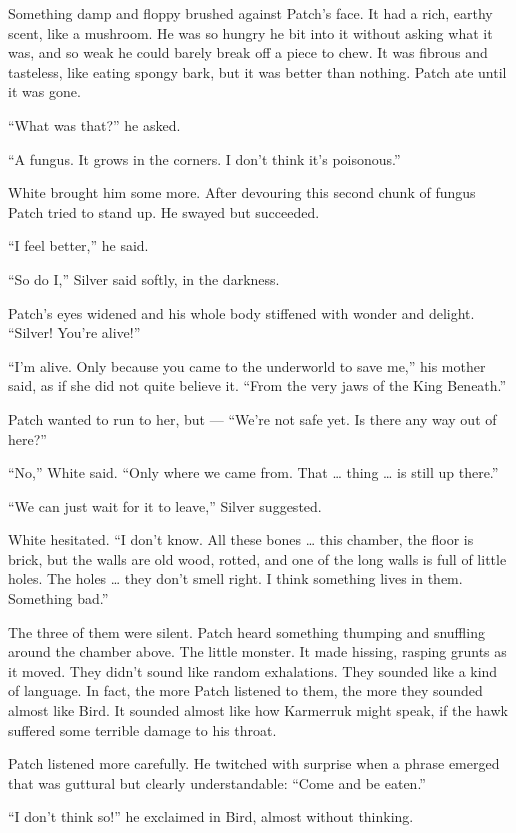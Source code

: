 \documentclass[ebook,oneside,openany,12pt]{memoir}
\begin{document}
Something damp and floppy brushed against Patch’s face. It had a rich,
earthy scent, like a mushroom. He was so hungry he bit into it without
asking what it was, and so weak he could barely break off a piece to
chew. It was fibrous and tasteless, like eating spongy bark, but it
was better than nothing. Patch ate until it was gone.

“What was that?” he asked.

“A fungus. It grows in the corners. I don’t think it’s poisonous.”

White brought him some more. After devouring this second chunk of
fungus Patch tried to stand up. He swayed but succeeded.

“I feel better,” he said.

“So do I,” Silver said softly, in the darkness.

Patch’s eyes widened and his whole body stiffened with wonder and
delight. “Silver! You’re alive!”

“I’m alive. Only because you came to the underworld to save me,” his
mother said, as if she did not quite believe it. “From the very jaws
of the King Beneath.”

Patch wanted to run to her, but — “We’re not safe yet. Is there any
way out of here?”

“No,” White said. “Only where we came from. That … thing … is still up
there.”

“We can just wait for it to leave,” Silver suggested.

White hesitated. “I don’t know. All these bones … this chamber, the
floor is brick, but the walls are old wood, rotted, and one of the
long walls is full of little holes. The holes … they don’t smell
right. I think something lives in them. Something bad.”

The three of them were silent. Patch heard something thumping and
snuffling around the chamber above. The little monster. It made
hissing, rasping grunts as it moved. They didn’t sound like random
exhalations. They sounded like a kind of language. In fact, the more
Patch listened to them, the more they sounded almost like Bird. It
sounded almost like how Karmerruk might speak, if the hawk suffered
some terrible damage to his throat.

Patch listened more carefully. He twitched with surprise when a phrase
emerged that was guttural but clearly understandable: “Come and be
eaten.”

“I don’t think so!” he exclaimed in Bird, almost without thinking.
\end{document}
